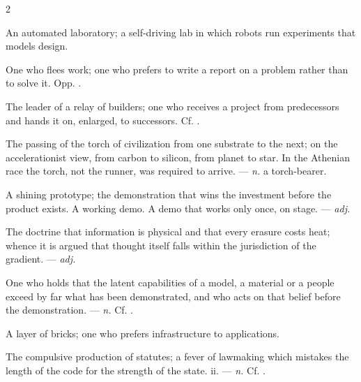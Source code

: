 \begin{multicols}{2}

 An automated laboratory; a self-driving lab in which robots run experiments that models design.  

 One who flees work;  one who prefers to write a report on a problem rather than to solve it. Opp. .

 The leader of a relay of builders; one who receives a project from predecessors and hands it on, enlarged, to successors. Cf. .

 The passing of the torch of civilization from one substrate to the next; on the accelerationist view, from carbon to silicon, from planet to star. In the Athenian race the torch, not the runner, was required to arrive. —  \textit{n.} a torch-bearer.

 A shining prototype; the demonstration that wins the investment before the product exists.  A working demo.   A demo that works only once, on stage. —  \textit{adj.}

 The doctrine that information is physical and that every erasure costs heat; whence it is argued that thought itself falls within the jurisdiction of the gradient. —  \textit{adj.}

 One who holds that the latent capabilities of a model, a material or a people exceed by far what has been demonstrated, and who acts on that belief before the demonstration. —  \textit{n.} Cf. .

 A layer of bricks; one who prefers infrastructure to applications. 

 The compulsive production of statutes; a fever of lawmaking which mistakes the length of the code for the strength of the state.   ii. —  \textit{n.} Cf. .


\end{multicols}
